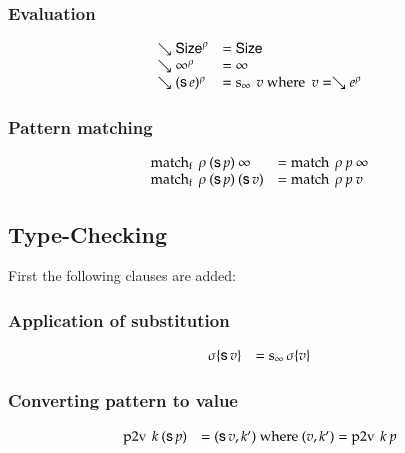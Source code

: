 \subsubsection{Evaluation}

\[
\begin{array}{ll}
\searrow \mathsf{Size}^{\rho} & = \mathsf{Size} \\
\searrow \infty^{\rho} & = \infty  \\
\searrow (\mathsf{s}\, e)^{\rho} & = \operatorname{s_{\infty}} \: v \mbox{ where } \: v = \searrow e^{\rho} \\ 
\end{array}
\]



\subsubsection{Pattern matching}
\[
\begin{array}{ll}
\operatorname{match_f} \: \rho \: (\mathsf{s}\, p) \: \infty & = \operatorname{match} \: \rho \: p \: \infty \\
\operatorname{match_f} \: \rho \: (\mathsf{s}\, p) \: (\mathsf{s}\, v) & = \operatorname{match} \: \rho \: p \: v \\
\end{array}
\]

\subsection{Type-Checking}

First the following clauses are added:
\subsubsection{Application of substitution}
\[
\begin{array}{ll}
\sigma\{\mathsf{s}\, v\} & = \operatorname{s_{\infty}} \sigma\{v\} \\
\end{array}
\]

\subsubsection{Converting pattern to value}
\[
\begin{array}{ll}
\operatorname{p2v} \: k \: (\mathsf{s}\, p) & = (\mathsf{s}\, v,k') \mbox{ where } (v,k') = \operatorname{p2v} \: k \: p\\
\end{array}
\]

